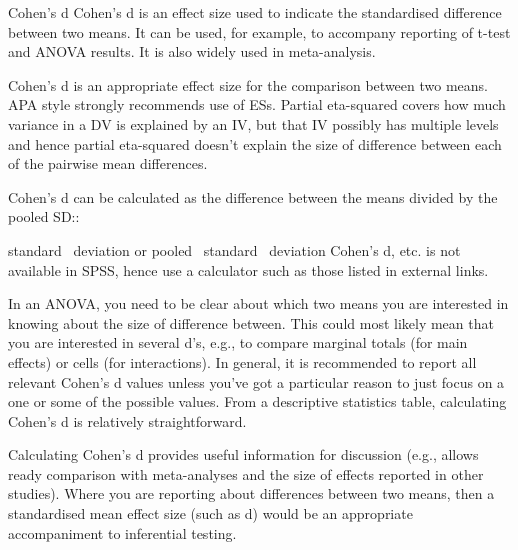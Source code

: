 Cohen's d
Cohen's d is an effect size used to indicate the standardised difference between two means. It can be used, for example, to accompany reporting of t-test and ANOVA results. It is also widely used in meta-analysis.

Cohen's d is an appropriate effect size for the comparison between two means. APA style strongly recommends use of ESs. Partial eta-squared covers how much variance in a DV is explained by an IV, but that IV possibly has multiple levels and hence partial eta-squared doesn't explain the size of difference between each of the pairwise mean differences.

Cohen's d can be calculated as the difference between the means divided by the pooled SD::

 {\textrm{standard \ deviation}}  or  {\textrm{pooled \ standard \ deviation}} 
Cohen's d, etc. is not available in SPSS, hence use a calculator such as those listed in external links.

In an ANOVA, you need to be clear about which two means you are interested in knowing about the size of difference between. This could most likely mean that you are interested in several d's, e.g., to compare marginal totals (for main effects) or cells (for interactions). In general, it is recommended to report all relevant Cohen's d values unless you've got a particular reason to just focus on a one or some of the possible values. From a descriptive statistics table, calculating Cohen's d is relatively straightforward.

Calculating Cohen's d provides useful information for discussion (e.g., allows ready comparison with meta-analyses and the size of effects reported in other studies). Where you are reporting about differences between two means, then a standardised mean effect size (such as d) would be an appropriate accompaniment to inferential testing.

